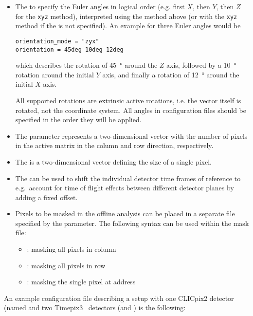 \begin{itemize}
\item The  to specify the Euler angles in logical order (e.g. first $X$, then $Y$, then $Z$ for the \texttt{xyz} method), interpreted using the method above (or with the \texttt{xyz} method if the  is not specified). An example for three Euler angles would be
\begin{verbatim}
orientation_mode = "zyx"
orientation = 45deg 10deg 12deg
\end{verbatim}
which describes the rotation of \SI{45}{\degree} around the $Z$ axis, followed by a \SI{10}{\degree} rotation around the initial $Y$ axis, and finally a rotation of \SI{12}{\degree} around the initial $X$ axis.
\begin{warning}
All supported rotations are extrinsic active rotations, i.e. the vector itself is rotated, not the coordinate system. All angles in configuration files should be specified in the order they will be applied.
\end{warning}

\item The  parameter represents a two-dimensional vector with the number of pixels in the active matrix in the column and row direction, respectively.
\item The  is a two-dimensional vector defining the size of a single pixel.
\item The  can be used to shift the individual detector time frames of reference to e.g.\ account for time of flight effects between different detector planes by adding a fixed offset.
\item Pixels to be masked in the offline analysis can be placed in a separate file specified by the  parameter. The following syntax can be used within the mask file:
\begin{itemize}
    \item {}: masking all pixels in column 
    \item {}: masking all pixels in row 
    \item {}: masking the single pixel at address 
\end{itemize}
\end{itemize}

An example configuration file describing a setup with one CLICpix2 detector (named  and two Timepix3~\cite{timepix} detectors (and ) is the following:

